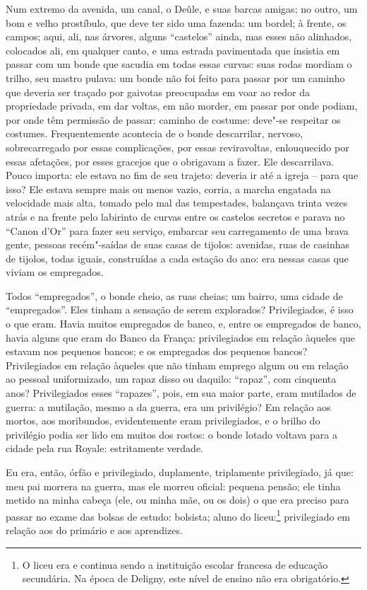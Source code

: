 Num extremo da avenida, um canal, o Deûle, e suas barcas amigas; no
outro, um bom e velho prostíbulo, que deve ter sido uma fazenda: um
bordel; à frente, os campos; aqui, ali, nas árvores, alguns ``castelos''
ainda, mas esses não alinhados, colocados ali, em qualquer canto, e uma
estrada pavimentada que insistia em passar com um bonde que sacudia em
todas essas curvas: suas rodas mordiam o trilho, seu mastro pulava: um
bonde não foi feito para passar por um caminho que deveria ser traçado
por gaivotas preocupadas em voar ao redor da propriedade privada, em dar
voltas, em não morder, em passar por onde podiam, por onde têm permissão
de passar: caminho de costume: deve"-se respeitar os costumes.
Frequentemente acontecia de o bonde descarrilar, nervoso, sobrecarregado
por essas complicações, por essas reviravoltas, enlouquecido por essas
afetações, por esses gracejos que o obrigavam a fazer. Ele descarrilava.
Pouco importa: ele estava no fim de seu trajeto: deveria ir até a igreja
-- para que isso? Ele estava sempre mais ou menos vazio, corria, a
marcha engatada na velocidade mais alta, tomado pelo mal das
tempestades, balançava trinta vezes atrás e na frente pelo labirinto de
curvas entre os castelos secretos e parava no ``Canon d'Or'' para fazer
seu serviço, embarcar seu carregamento de uma brava gente, pessoas
recém"-saídas de suas casas de tijolos: avenidas, ruas de casinhas de
tijolos, todas iguais, construídas a cada estação do ano: era nessas
casas que viviam os empregados.

Todos ``empregados'', o bonde cheio, as ruas cheias; um bairro, uma
cidade de ``empregados''. Eles tinham a sensação de serem explorados?
Privilegiados, é isso o que eram. Havia muitos empregados de banco, e,
entre os empregados de banco, havia alguns que eram do Banco da França:
privilegiados em relação àqueles que estavam nos pequenos bancos; e os
empregados dos pequenos bancos? Privilegiados em relação àqueles que não
tinham emprego algum ou em relação ao pessoal uniformizado, um
rapaz disso
ou daquilo: ``rapaz'', com cinquenta anos? Privilegiados esses
``rapazes'', pois, em sua maior parte, eram mutilados de guerra: a
mutilação, mesmo a da guerra, era um privilégio? Em relação aos mortos,
aos moribundos, evidentemente eram privilegiados, e o brilho do
privilégio podia ser lido em muitos dos rostos: o bonde lotado voltava
para a cidade pela rua Royale: estritamente verdade.

Eu era, então, órfão e privilegiado, duplamente, triplamente
privilegiado, já que: meu pai morrera na guerra, mas ele morreu oficial:
pequena pensão; ele tinha metido na minha cabeça (ele, ou minha mãe, ou
os dois) o que era preciso para passar no exame das bolsas de estudo:
bolsista; aluno do liceu:\footnote{O liceu era e continua sendo a
  instituição escolar francesa de educação secundária. Na época de
  Deligny, este nível de ensino não era obrigatório.} privilegiado em
relação aos do primário e aos aprendizes.


